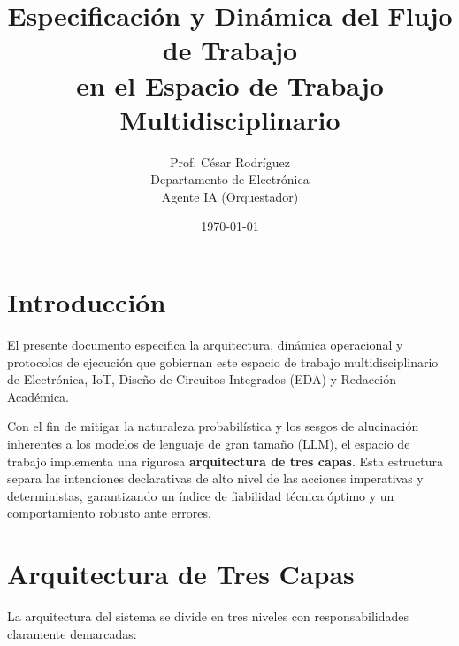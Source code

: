 \documentclass[12pt,a4paper]{article}
\title{Especificación y Dinámica del Flujo de Trabajo\\en el Espacio de Trabajo Multidisciplinario}
\author{Prof. César Rodríguez \\ Departamento de Electrónica \\ Agente IA (Orquestador)}
\date{\today}
\begin{document}
\maketitle
\tableofcontents
\newpage

\section{Introducción}

El presente documento especifica la arquitectura, dinámica operacional y protocolos de ejecución que gobiernan este espacio de trabajo multidisciplinario de Electrónica, IoT, Diseño de Circuitos Integrados (EDA) y Redacción Académica. 

Con el fin de mitigar la naturaleza probabilística y los sesgos de alucinación inherentes a los modelos de lenguaje de gran tamaño (LLM), el espacio de trabajo implementa una rigurosa \textbf{arquitectura de tres capas}. Esta estructura separa las intenciones declarativas de alto nivel de las acciones imperativas y deterministas, garantizando un índice de fiabilidad técnica óptimo y un comportamiento robusto ante errores.

\section{Arquitectura de Tres Capas}

La arquitectura del sistema se divide en tres niveles con responsabilidades claramente demarcadas:
\end{document}
